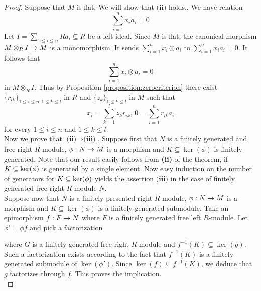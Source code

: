 \begin{proof}
Suppose that $M$ is flat. We will show that $\textbf{(ii)}$ holds.. We have relation
$$\sum^n_{i=1}x_ia_{i}=0$$
Let $I=\sum_{1\leq i\leq n}Ra_{i}\subseteq R$ be a left ideal. Since $M$ is flat, the canonical morphism $M\otimes_RI\rightarrow M$ is a monomorphism. It sends $\sum_{i=1}^nx_i\otimes a_i$ to $\sum_{i=1}^nx_ia_i=0$. It follows that 
$$\sum^n_{i=1}x_i\otimes a_i=0$$
in $M\otimes_RI$. Thus by Proposition \ref{proposition:zerocriterion} there exist $\{r_{ik}\}_{1\leq i\leq n,1\leq k\leq l}$ in $R$ and $\{z_k\}_{1\leq k\leq l}$ in $M$ such that
$$x_i=\sum^l_{k=1}z_kr_{ik},\,0=\sum^n_{i=1}r_{ik}a_i$$
for every  $1\leq i \leq n$ and $1\leq k\leq l$.\\
Now we prove that $\textbf{(ii)}\Rightarrow \textbf{(iii)}$. Suppose first that $N$ is a finitely generated and free right $R$-module, $\phi:N\rightarrow M$ is a morphism and $K\subseteq \ker(\phi)$ is finitely generated. Note that our result easily follows from \textbf{(ii)} of the theorem, if $K\subseteq \mathrm{ker}(\phi)$ is generated by a single element. Now easy induction on the number of generators for $K\subseteq \mathrm{ker}(\phi)$ yields the assertion $\textbf{(iii)}$ in the case of finitely generated free right $R$-module $N$.\\
Suppose now that $N$ is a finitely presented right $R$-module, $\phi:N\rightarrow M$ is a morphism and $K\subseteq \ker(\phi)$ is a finitely generated submodule. Take an epimorphism $f:F\rightarrow N$ where $F$ is a finitely generated free left $R$-module. Let $\phi'=\phi f$ and pick a factorization
\begin{center}
\end{center}
where $G$ is a finitely generated free right $R$-module and $f^{-1}(K)\subseteq \ker(g)$. Such a factorization exists according to the fact that $f^{-1}(K)$ is a finitely generated submodule of $\ker(\phi')$. Since $\ker(f)\subseteq f^{-1}(K)$, we deduce that $g$ factorizes through $f$. This proves the implication. \\

\end{proof}
